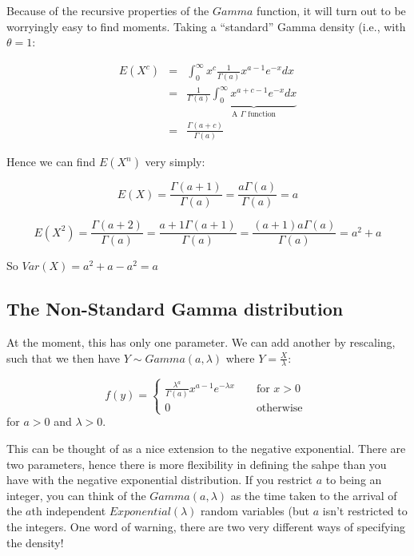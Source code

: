\documentclass[12pt]{extbook}
\begin{document}
Because of the recursive properties of the $Gamma$ function, it will turn out to be worryingly easy to find moments.   Taking a ``standard'' Gamma density (i.e., with $\theta=1$:

\begin{eqnarray*}
E(X^c) &=&  \int_0^{\infty} x^c \frac{1}{\Gamma (a)} x^{a-1} e^{-x} dx \\
&=& \frac{1}{\Gamma (a)} \underbrace{\int_0^{\infty}  x^{a+c-1} e^{-x} dx}_{\mbox{A }\Gamma \mbox{ function}} \\
&=& \frac{\Gamma(a+c)}{\Gamma(a)}
\end{eqnarray*}

Hence we can find $E(X^n)$ very simply:

\begin{displaymath}
E(X) = \frac{\Gamma (a+1)}{\Gamma(a)} = \frac{a \Gamma(a)}{\Gamma(a)} = a
\end{displaymath}


\begin{displaymath}
E(X^2) = \frac{\Gamma (a+2)}{\Gamma(a)} = \frac{a+1 \Gamma(a+1)}{\Gamma(a)} = \frac{(a+1)a\Gamma(a)}{\Gamma(a)}  = a^2+a
\end{displaymath}

So $Var(X) = a^2+a-a^2 = a$



\subsection{The Non-Standard Gamma distribution}


At the moment, this has only one parameter.   We can add another by rescaling, such that we then have $Y \sim Gamma(a,\lambda)$ where $Y = \frac{X}{\lambda}$:

\begin{displaymath}
f(y) = \left\{ \begin{array}{rrr} \frac{\lambda^a}{\Gamma (a)} x^{a-1} e^{-\lambda x} &  &\mbox{ for } x>0 \\ 0 & & \mbox{ otherwise } \end{array} \right.
\end{displaymath}
for $a>0$ and $\lambda>0$.

This can be thought of as a nice extension to the negative exponential.  There are two parameters, hence there is more flexibility in defining the sahpe than you have with the negative exponential distribution.   If you restrict $a$ to being an integer, you can think of the $Gamma(a, \lambda)$ as the time taken to the arrival of the $a$th independent $Exponential(\lambda)$ random variables (but $a$ isn't restricted to the integers.   One word of warning, there are two very different ways of specifying the density!  %
\end{document}
